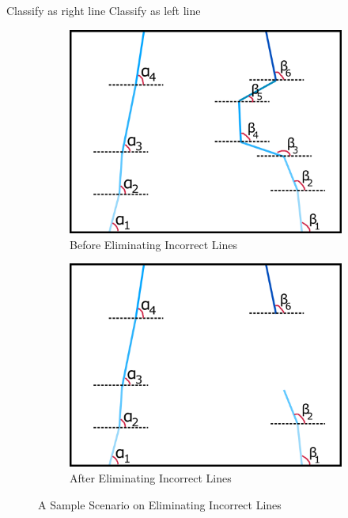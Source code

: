\documentclass[a4paper,12pt]{article}
\begin{document}
\begin{enumerate}
\begin{algorithm}[b!]
				{ 
					{
						Classify as right line 
					}
					\Else
					{
						Classify as left line 
					}
				}
			\end{algorithm}
			\begin{figure}[b!]
				\setlength{\unitlength}{\textwidth} 
				\centering
				\begin{subfigure}{.46\textwidth}
					\centering
					\includegraphics[width=0.44\unitlength]{images/dataP_explained1}
					\caption{\label{fig:dataP_explained1} Before Eliminating Incorrect Lines}
				\end{subfigure}%
				\begin{subfigure}{.46\textwidth}
					\centering
					\includegraphics[width=0.44\unitlength]{images/dataP_explained2}
					\caption{\label{fig:dataP_explained2} After Eliminating Incorrect Lines}
				\end{subfigure}
				\caption{\label{fig:dataP_explained} A Sample Scenario on Eliminating Incorrect Lines}
			\end{figure}




\end{enumerate}
\end{document}
